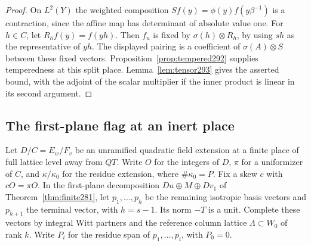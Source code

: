 \documentclass[a4paper,11pt]{article}
\theoremstyle{definition}
\theoremstyle{remark}
\numberwithin{equation}{section}
\begin{document}
\begin{proof}
On \(L^2(Y)\) the weighted composition
\(S f(y)=\phi(y) f(y\beta^{-1})\) is a contraction, since
the affine map has determinant of absolute value one.
For \(h\in C\), let \(R_h f(y)=f(yh)\). Then \(f_u\)
is fixed by \(\sigma(h)\otimes R_h\), by using \(s h\)
as the representative of \(yh\). The displayed pairing
is a coefficient of \(\sigma(A)\otimes S\) between these
fixed vectors. Proposition~\ref{prop:tempered292} supplies
temperedness at this split place. Lemma~\ref{lem:tensor293}
gives the asserted bound, with the adjoint of the scalar
multiplier if the inner product is linear in its second
argument.
\end{proof}

\subsection{The first-plane flag at an inert place}\label{nav:IV-47}
Let \(D/C=E_w/F_v\) be an unramified quadratic field extension
at a finite place of full lattice level away from \(QT\).
Write \(O\) for the integers of \(D\), \(\pi\) for a uniformizer
of \(C\), and \(\kappa/\kappa_0\) for the residue extension,
where \(\#\kappa_0=P\). Fix a skew \(c\) with \(cO=\pi O\).
In the first-plane decomposition \(Du\oplus M\oplus Dv_1\)
of Theorem~\ref{thm:finite281}, let
\(p_1,\ldots,p_h\) be the remaining isotropic basis vectors
and \(p_{h+1}\) the terminal vector, with \(h=s-1\).
Its norm \(-T\) is a unit. Complete these vectors by integral
Witt partners and the reference column lattice
\(\Lambda\subset W_0\) of rank \(k\). Write \(P_i\) for the
residue span of \(p_1,\ldots,p_i\), with \(P_0=0\).
\end{document}
